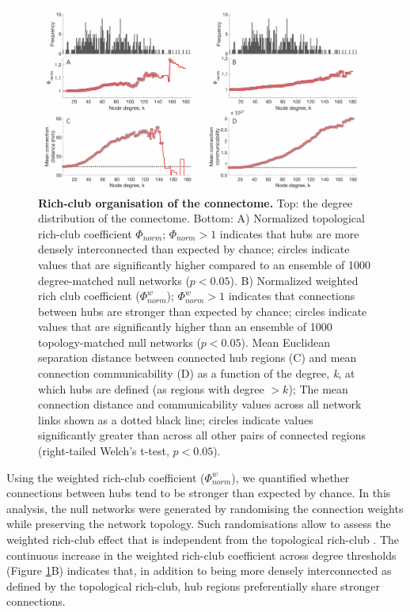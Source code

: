 \begin{figure}[h!]
\begin{center}
\includegraphics[width=1\textwidth]{Chapter5/Ch5Fig3.pdf}%
\end{center}
\caption{\textbf{Rich-club organisation of the connectome.}
Top: the degree distribution of the connectome. Bottom: A) Normalized topological rich-club coefficient $\Phi_{norm}$; $\Phi_{norm} >1$ indicates that hubs are more densely interconnected than expected by chance; circles indicate values that are significantly higher compared to an ensemble of 1000 degree-matched null networks ($p < 0.05$). B) Normalized weighted rich club coefficient ($\Phi_{norm}^{w}$); $\Phi_{norm}^{w}>1$ indicates that connections between hubs are stronger than expected by chance; circles indicate values that are significantly higher than an ensemble of 1000 topology-matched null networks ($p < 0.05$). Mean Euclidean separation distance between connected hub regions (C) and mean connection communicability (D) as a function of the degree, \textit{k}, at which hubs are defined (as regions with degree $> k$); The mean connection distance and communicability values across all network links shown as a dotted black line; circles indicate values significantly greater than across all other pairs of connected regions (right-tailed Welch’s t-test, $p < 0.05$).}
\label{fig:Ch5Fig3}
\end{figure}

Using the weighted rich-club coefficient ($\Phi_{norm}^{w}$), we quantified whether connections between hubs tend to be stronger than expected by chance. In this analysis, the null networks were generated by randomising the connection weights while preserving the network topology. Such randomisations allow to assess the weighted rich-club effect that is independent from the topological rich-club \citep{Alstott2014}. The continuous increase in the weighted rich-club coefficient across degree thresholds (Figure \ref{fig:Ch5Fig3}B) indicates that, in addition to being more densely interconnected as defined by the topological rich-club, hub regions preferentially share stronger connections.

